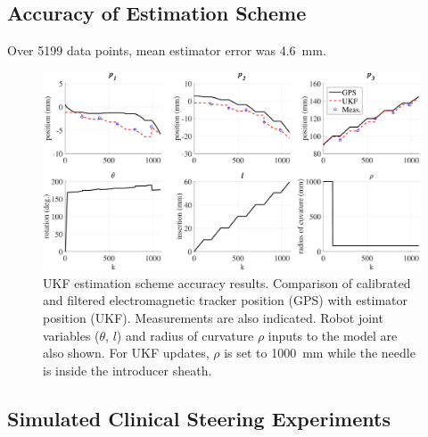 \subsection{Accuracy of Estimation Scheme}
Over 5199 data points, mean estimator error was 4.6~mm.


\begin{figure}[!t]
\centering
\includegraphics[width = \columnwidth]{./Images/Chapter5/UKFAccuracy/UKFAccuracy.pdf}%
\caption[UKF accuracy results]{UKF estimation scheme accuracy results. Comparison of calibrated and filtered electromagnetic tracker position (GPS) with estimator position (UKF). Measurements are also indicated. Robot joint variables ($\theta$, $l$) and radius of curvature $\rho$ inputs to the model are also shown. For UKF updates, $\rho$ is set to 1000~mm while the needle is inside the introducer sheath. }
\label{fig:GUI}
\end{figure}  

\subsection{Simulated Clinical Steering Experiments}
